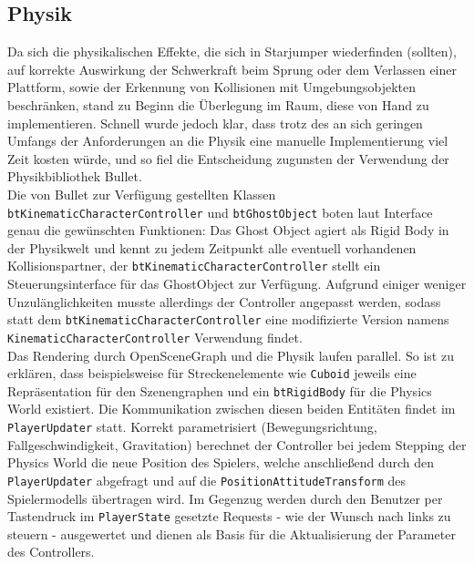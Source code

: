 \documentclass{llncs}
\begin{document}
\subsection{Physik}
Da sich die physikalischen Effekte, die sich in Starjumper wiederfinden (sollten), auf korrekte Auswirkung der Schwerkraft
beim Sprung oder dem Verlassen einer Plattform, sowie der Erkennung von Kollisionen mit Umgebungsobjekten beschr\"anken,
stand zu Beginn die \"Uberlegung im Raum, diese von Hand zu implementieren. Schnell wurde jedoch klar, dass trotz des
an sich geringen Umfangs der Anforderungen an die Physik eine manuelle Implementierung viel Zeit kosten w\"urde, und so fiel
die Entscheidung zugunsten der Verwendung der Physikbibliothek Bullet.\\
Die von Bullet zur Verf\"ugung gestellten Klassen \texttt{btKinematicCharacterController} und \texttt{btGhostObject} boten
laut Interface genau die gew\"unschten Funktionen: Das Ghost Object agiert als Rigid Body in der Physikwelt und kennt
zu jedem Zeitpunkt alle eventuell vorhandenen Kollisionspartner, der \texttt{btKinematicCharacterController} stellt ein
Steuerungsinterface f\"ur das GhostObject zur Verf\"ugung. Aufgrund einiger weniger Unzul\"anglichkeiten musste allerdings
der Controller angepasst werden, sodass statt dem \texttt{btKinematicCharacterController} eine modifizierte Version
namens \texttt{KinematicCharacterController} Verwendung findet.\\
Das Rendering durch OpenSceneGraph und die Physik laufen parallel. So ist zu erkl\"aren, dass beispielsweise f\"ur
Streckenelemente wie \texttt{Cuboid} jeweils eine Repr\"asentation f\"ur den Szenengraphen und ein \texttt{btRigidBody}
f\"ur die Physics World existiert. Die Kommunikation zwischen diesen beiden Entit\"aten findet im \texttt{PlayerUpdater}
statt. Korrekt parametrisiert (Bewegungsrichtung, Fallgeschwindigkeit, Gravitation) berechnet der Controller bei jedem
Stepping der Physics World die neue Position des Spielers, welche anschlie\ss end durch den \texttt{PlayerUpdater}
abgefragt und auf die \texttt{PositionAttitudeTransform} des Spielermodells \"ubertragen wird. Im Gegenzug werden
durch den Benutzer per Tastendruck im \texttt{PlayerState} gesetzte Requests - wie der Wunsch nach links zu steuern -
ausgewertet und dienen als Basis f\"ur die Aktualisierung der Parameter des Controllers.
\end{document}
